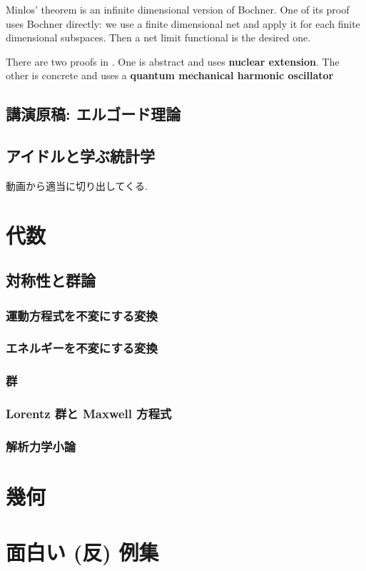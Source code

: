 \documentclass[openany, a4paper, oneside]{book}
\theoremstyle{break}
\theoremstyle{breakdefn}
\begin{document}
Minlos' theorem is an infinite dimensional version of Bochner.
One of its proof uses Bochner directly: we use a finite dimensional net and apply it for each finite dimensional subspaces.
Then a net limit functional is the desired one.

There are two proofs in \cite{AsaoArai5}.
One is abstract and uses \textbf{nuclear extension}.
The other is concrete and uses a \textbf{quantum mechanical harmonic oscillator}
\chapter{講演原稿: エルゴード理論}
\label{sec-8-3}
\chapter{アイドルと学ぶ統計学}
\label{sec-8-4}

動画から適当に切り出してくる.
\part{代数}
\label{sec-9}
\chapter{対称性と群論}
\label{sec-9-1}
\section{運動方程式を不変にする変換}
\label{sec-9-1-1}
\section{エネルギーを不変にする変換}
\label{sec-9-1-2}
\section{群}
\label{sec-9-1-3}
\section{Lorentz 群と Maxwell 方程式}
\label{sec-9-1-4}
\section{解析力学小論}
\label{sec-9-1-5}
\part{幾何}
\label{sec-10}
\part{面白い (反) 例集}
\label{sec-11}
\end{document}
